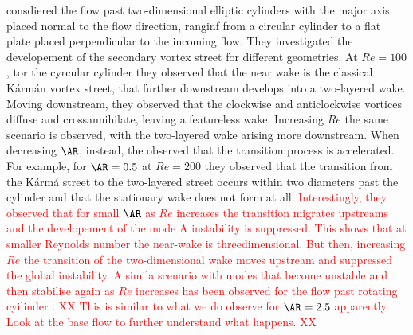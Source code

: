\cite{thompson-etal-2014} consdiered the flow past two-dimensional elliptic cylinders with the major axis placed normal to the flow direction, ranginf from a circular cylinder to a flat plate placed perpendicular to the incoming flow. They investigated the developement of the secondary vortex street for different geometries. At $Re=100$, tor the cyrcular cylinder they observed that the near wake is the classical K\'{a}rm\'{a}n vortex street, that further downstream develops into a two-layered wake. Moving downstream, they observed that the clockwise and anticlockwise vortices diffuse and crossannihilate, leaving a featureless wake. Increasing $Re$ the same scenario is observed, with the two-layered wake arising more downstream. When decreasing $\AR$, instead, the observed that the transition process is accelerated. For example, for $\AR=0.5$ at $Re=200$ they observed that the transition from the K\'{a}rm\'{a} street to the two-layered street occurs within two diameters past the cylinder and that the stationary wake does not form at all. \textcolor{red}{Interestingly, they observed that for small $\AR$ as $Re$ increases the transition migrates upstreams and the developement of the mode A instability is suppressed. This shows that at smaller Reynolds number the near-wake is threedimensional. But then, increasing $Re$ the transition of the two-dimensional wake moves upstream and suppressed the global instability. A simila scenario with modes that become unstable and then stabilise again as $Re$ increases has been observed for the flow past rotating cyilinder \citep{rao-etal-2013,radi-etal-2013}. XX This is similar to what we do observe for $\AR=2.5$ apparently. Look at the base flow to further understand what happens. XX}



